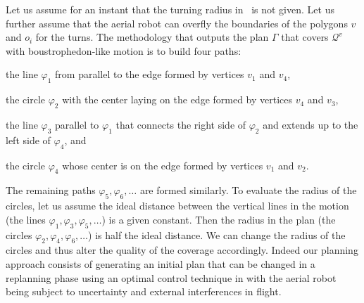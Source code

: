 Let us assume for an instant that the turning radius in~ is not given. Let us further assume that the aerial robot can overfly the boundaries of the polygons $v$ and $o_i$ for the turns. The methodology that outputs the plan $\Gamma$ that covers $\mathcal{Q}^v$ with boustrophedon-like motion is to build four paths:
\begin{enumerate*}[label={(\alph*)},font={\textit}]
  \item the line $\varphi_1$ from  parallel to the edge formed by vertices $v_1$ and $v_4$,
  \item the circle $\varphi_2$ with the center laying on the edge formed by vertices $v_4$ and $v_3$,
  \item the line $\varphi_3$ parallel to $\varphi_1$ that connects the right side of $\varphi_2$ and extends up to the left side of $\varphi_4$, and
  \item the circle $\varphi_4$ whose center is on the edge formed by vertices $v_1$ and $v_2$.
\end{enumerate*}
The remaining paths $\varphi_5,\varphi_6,\dots$ are formed similarly. To evaluate the radius of the circles, let us assume the ideal distance between the vertical lines in the motion (the lines $\varphi_1,\varphi_3,\varphi_5,\dots$) is a given constant. Then the radius in the plan (the circles $\varphi_2,\varphi_4,\varphi_6,\dots$) is half the ideal distance. We can change the radius of the circles and thus alter the quality of the coverage accordingly. Indeed our planning approach consists of generating an initial plan that can be changed in a replanning phase using an optimal control technique in  with the aerial robot being subject to uncertainty and external interferences in flight.

